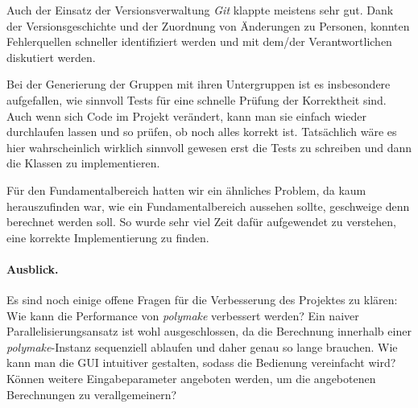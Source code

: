 \noindent Auch der Einsatz der Versionsverwaltung \emph{Git} klappte meistens sehr gut. Dank der Versionsgeschichte und der Zuordnung
von Änderungen zu Personen, konnten Fehlerquellen schneller identifiziert werden und mit dem/der Verantwortlichen diskutiert werden.

\noindent Bei der Generierung der Gruppen mit ihren Untergruppen ist es insbesondere aufgefallen, wie sinnvoll Tests für eine schnelle
Prüfung der Korrektheit sind. Auch wenn sich Code im Projekt verändert, kann man sie einfach wieder durchlaufen lassen und so prüfen,
ob noch alles korrekt ist. Tatsächlich wäre es hier wahrscheinlich wirklich sinnvoll gewesen erst die Tests zu schreiben und dann die
Klassen zu implementieren.

\noindent Für den Fundamentalbereich hatten wir ein ähnliches Problem, da kaum herauszufinden war, wie ein Fundamentalbereich aussehen sollte,
geschweige denn berechnet werden soll. So wurde sehr viel Zeit dafür aufgewendet zu verstehen, eine korrekte Implementierung zu finden.

\paragraph{Ausblick.}
Es sind noch einige offene Fragen für die Verbesserung des Projektes zu klären:\\
\noindent Wie kann die Performance von \emph{polymake} verbessert werden? Ein naiver Parallelisierungsansatz ist wohl ausgeschlossen,
da die Berechnung innerhalb einer \emph{polymake}-Instanz sequenziell ablaufen und daher genau so lange brauchen.
Wie kann man die GUI intuitiver gestalten, sodass die Bedienung vereinfacht wird?
Können weitere Eingabeparameter angeboten werden, um die angebotenen Berechnungen zu verallgemeinern?

